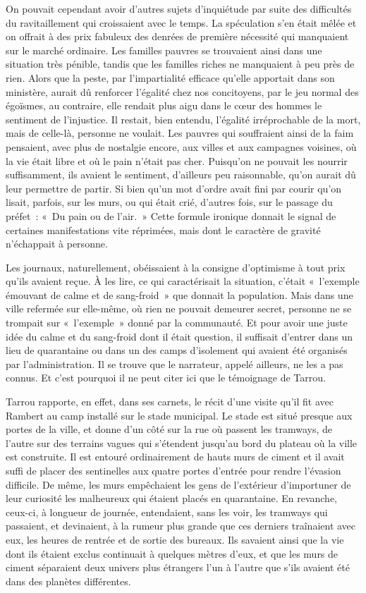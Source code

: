 \documentclass[french,twoside]{book} %
\begin{document}
On pouvait cependant avoir d’autres sujets d’inquiétude par suite des difficultés du ravitaillement qui croissaient avec le temps. La spéculation s’en était mêlée et on offrait à des prix fabuleux des denrées de première nécessité qui manquaient sur le marché ordinaire. Les familles pauvres se trouvaient ainsi dans une situation très pénible, tandis que les familles riches ne manquaient à peu près de rien. Alors que la peste, par l’impartialité efficace qu’elle apportait dans son ministère, aurait dû renforcer l’égalité chez nos concitoyens, par le jeu normal des égoïsmes, au contraire, elle rendait plus aigu dans le cœur des hommes le sentiment de l’injustice. Il restait, bien entendu, l’égalité irréprochable de la mort, mais de celle-là, personne ne voulait. Les pauvres qui souffraient ainsi de la faim pensaient, avec plus de nostalgie encore, aux villes et aux campagnes voisines, où la vie était libre et où le pain n’était pas cher. Puisqu’on ne pouvait les nourrir suffisamment, ils avaient le sentiment, d’ailleurs peu raisonnable, qu’on aurait dû leur permettre de partir. Si bien qu’un mot d’ordre avait fini par courir qu’on lisait, parfois, sur les murs, ou qui était crié, d’autres fois, sur le passage du préfet : « Du pain ou de l’air. » Cette formule ironique donnait le signal de certaines manifestations vite réprimées, mais dont le caractère de gravité n’échappait à personne.\par
Les journaux, naturellement, obéissaient à la consigne d’optimisme à tout prix qu’ils avaient reçue. À les lire, ce qui caractérisait la situation, c’était « l’exemple émouvant de calme et de sang-froid » que donnait la population. Mais dans une ville refermée sur elle-même, où rien ne pouvait demeurer secret, personne ne se trompait sur « l’exemple » donné par la communauté. Et pour avoir une juste idée du calme et du sang-froid dont il était question, il suffisait d’entrer dans un lieu de quarantaine ou dans un des camps d’isolement qui avaient été organisés par l’administration. Il se trouve que le narrateur, appelé ailleurs, ne les a pas connus. Et c’est pourquoi il ne peut citer ici que le témoignage de Tarrou.\par
Tarrou rapporte, en effet, dans ses carnets, le récit d’une visite qu’il fit avec Rambert au camp installé sur le stade municipal. Le stade est situé presque aux portes de la ville, et donne d’un côté sur la rue où passent les tramways, de l’autre sur des terrains vagues qui s’étendent jusqu’au bord du plateau où la ville est construite. Il est entouré ordinairement de hauts murs de ciment et il avait suffi de placer des sentinelles aux quatre portes d’entrée pour rendre l’évasion difficile. De même, les murs empêchaient les gens de l’extérieur d’importuner de leur curiosité les malheureux qui étaient placés en quarantaine. En revanche, ceux-ci, à longueur de journée, entendaient, sans les voir, les tramways qui passaient, et devinaient, à la rumeur plus grande que ces derniers traînaient avec eux, les heures de rentrée et de sortie des bureaux. Ils savaient ainsi que la vie dont ils étaient exclus continuait à quelques mètres d’eux, et que les murs de ciment séparaient deux univers plus étrangers l’un à l’autre que s’ils avaient été dans des planètes différentes.\par
\end{document}
